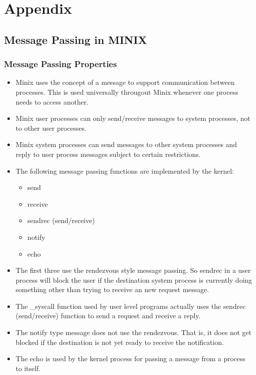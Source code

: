 \chapter{Appendix}

\section{Message Passing in MINIX}

\subsection{Message Passing Properties}

\begin{itemize}

\item Minix uses the concept of a message to support communication between processes. This is used universally througout Minix whenever one process needs to access another.

\item    Minix user processes can only send/receive messages to system processes, not to other user processes.

\item    Minix system processes can send messages to other system processes and reply to user process messages subject to certain restrictions.

\item    The following message passing functions are implemented by the kernel:
	\begin{itemize}
	  \item   send
      \item   receive
      \item   sendrec (send/receive)
      \item   notify
      \item   echo
	\end{itemize}
       

\item The first three use the rendezvous style message passing. So sendrec in a user process will block the user if the destination system process is currently doing something other than trying to receive an new request message.

\item The \_syscall function used by user level programs actually uses the sendrec (send/receive) function to send a request and receive a reply.

\item  The notify type message does not use the rendezvous. That is, it does not get blocked if the destination is not yet ready to receive the notification.

\item The echo is used by the kernel process for passing a message from a process to itself.

\end{itemize}

